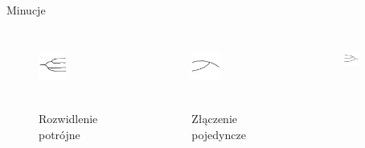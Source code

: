 \documentclass{beamer}
\begin{document}
\begin{frame}{Minucje}
    \begin{columns}
            \begin{figure}[t]
			    \centering
                \includegraphics[width=0.4\textwidth]{fingerprints/minucje/rozwidlenie3.jpg}\\~\
                \caption*{Rozwidlenie potrójne}
            \end{figure}
		    \begin{figure}[t]
			    \centering
                \includegraphics[width=0.4\textwidth]{fingerprints/minucje/zlaczenie1.jpg}\\~\
                \caption*{Złączenie pojedyncze}
            \end{figure}
        \column{0.25\textwidth}
            \begin{figure}[t]
                \centering
                \includegraphics[width=0.4\textwidth]{fingerprints/minucje/zlaczenie2.jpg}\\~\

\end{figure}
\end{columns}
\end{frame}
\end{document}
